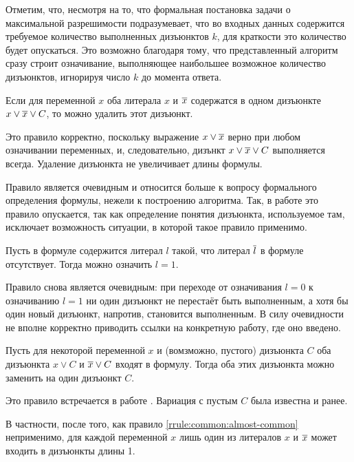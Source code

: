 Отметим, что, несмотря на то, что формальная постановка задачи о максимальной разрешимости подразумевает, что во входных данных содержится требуемое количество выполненных дизъюнктов $k$, для краткости это количество будет опускаться. Это возможно благодаря тому, что представленный алгоритм сразу строит означивание, выполняющее наибольшее возможное количество дизъюнктов, игнорируя число $k$ до момента ответа.

\begin{rrule}
 Если для переменной $x$ оба литерала $x$ и $\overline{x}$ содержатся в одном дизъюнкте $x \vee \overline{x} \vee C$, то можно удалить этот дизъюнкт.
 \label{rrule:common:complementary}
\end{rrule}

Это правило корректно, поскольку выражение $x \vee \overline{x}$ верно при любом означивании переменных, и, следовательно, дизънкт $x \vee \overline{x} \vee C$ выполняется всегда. Удаление дизъюнкта не увеличивает длины формулы.

Правило является очевидным и относится больше к вопросу формального определения формулы, нежели к построению алгоритма. Так, в работе \cite{bansal99} это правило опускается, так как определение понятия дизъюнкта, используемое там, исключает возможность ситуации, в которой такое правило применимо.

\begin{rrule}
 Пусть в формуле содержится литерал $l$ такой, что литерал $\overline{l}$ в формуле отсутствует. Тогда можно означить $l = 1$.
 \label{rrule:common:i0}
\end{rrule}

Правило снова является очевидным: при переходе от означивания $l = 0$ к означиванию $l = 1$ ни один дизъюнкт не перестаёт быть выполненным, а хотя бы один новый дизъюнкт, напротив, становится выполненным. В силу очевидности не вполне корректно приводить ссылки на конкретную работу, где оно введено.

\begin{rrule}
 Пусть для некоторой переменной $x$ и (вомзможно, пустого) дизъюнкта $C$ оба дизъюнкта $x \vee C$ и $\overline{x} \vee C$ входят в формулу. Тогда оба этих дизъюнкта можно заменить на один дизъюнкт $C$.
 \label{rrule:common:almost-common}
\end{rrule}

Это правило встречается в работе \cite{bansal99}. Вариация с пустым $C$ была известна и ранее.

\begin{note}
 В частности, после того, как правило \ref{rrule:common:almost-common} неприменимо, для каждой переменной $x$ лишь один из литералов $x$ и $\overline{x}$ может входить в дизъюнкты длины 1.
\end{note}

